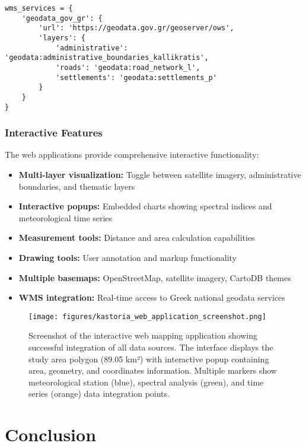 \documentclass[a4paper,12pt]{article}
\begin{document}
\begin{lstlisting}[caption=WMS service integration example]
wms_services = {
    'geodata_gov_gr': {
        'url': 'https://geodata.gov.gr/geoserver/ows',
        'layers': {
            'administrative': 'geodata:administrative_boundaries_kallikratis',
            'roads': 'geodata:road_network_l',
            'settlements': 'geodata:settlements_p'
        }
    }
}
\end{lstlisting}

\subsubsection{Interactive Features}

The web applications provide comprehensive interactive functionality:

\begin{itemize}
    \item \textbf{Multi-layer visualization:} Toggle between satellite imagery, administrative boundaries, and thematic layers
    \item \textbf{Interactive popups:} Embedded charts showing spectral indices and meteorological time series
    \item \textbf{Measurement tools:} Distance and area calculation capabilities
    \item \textbf{Drawing tools:} User annotation and markup functionality
    \item \textbf{Multiple basemaps:} OpenStreetMap, satellite imagery, CartoDB themes
    \item \textbf{WMS integration:} Real-time access to Greek national geodata services
\end{itemize}

\begin{figure}[H]
    \centering
    \texttt{[image: figures/kastoria\_web\_application\_screenshot.png]}
    \caption{Screenshot of the interactive web mapping application showing successful integration of all data sources. The interface displays the study area polygon (89.05 km²) with interactive popup containing area, geometry, and coordinates information. Multiple markers show meteorological station (blue), spectral analysis (green), and time series (orange) data integration points.}
    \label{fig:web_app}
\end{figure}

\section{Conclusion}
\end{document}
